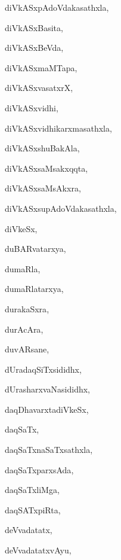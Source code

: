 \begin{multicols}{3}
{\noindent
{diVkASxpAdoVdakasathxla}, \pageref{diVkASxpAdoVdakasathxla}

\noindent
{diVkASxBasita}, \pageref{diVkASxBasita}

\noindent
{diVkASxBeVda}, \pageref{diVkASxBeVda}

\noindent
{diVkASxmaMTapa}, \pageref{diVkASxmaMTapa}

\noindent
{diVkASxvasatxrX}, \pageref{diVkASxvasatxrX}

\noindent
{diVkASxvidhi}, \pageref{diVkASxvidhi}

\noindent
{diVkASxvidhikarxmasathxla}, \pageref{diVkASxvidhikarxmasathxla}

\noindent
{diVkASxshuBakAla}, \pageref{diVkASxshuBakAla}

\noindent
{diVkASxsaMsakxqqta}, \pageref{diVkASxsaMsakxqqta}

\noindent
{diVkASxsaMsAkxra}, \pageref{diVkASxsaMsAkxra}

\noindent
{diVkASxsupAdoVdakasathxla}, \pageref{diVkASxsupAdoVdakasathxla}

\noindent
{diVkeSx}, \pageref{diVkeSx}

\noindent
{duBARvatarxya}, \pageref{duBARvatarxya}

\noindent
{dumaRla}, \pageref{dumaRla}

\noindent
{dumaRlatarxya}, \pageref{dumaRlatarxya}

\noindent
{durakaSxra}, \pageref{durakaSxra}

\noindent
{durAcAra}, \pageref{durAcAra}

\noindent
{duvARsane}, \pageref{duvARsane}

\noindent
{dUradaqSiTxsididhx}, \pageref{dUradaqSiTxsididhx}

\noindent
{dUrasharxvaNasididhx}, \pageref{dUrasharxvaNasididhx}

\noindent
{daqDhavarxtadiVkeSx}, \pageref{daqDhavarxtadiVkeSx}

\noindent
{daqSaTx}, \pageref{daqSaTx}

\noindent
{daqSaTxnaSaTxsathxla}, \pageref{daqSaTxnaSaTxsathxla}

\noindent
{daqSaTxparxsAda}, \pageref{daqSaTxparxsAda}

\noindent
{daqSaTxliMga}, \pageref{daqSaTxliMga}

\noindent
{daqSATxpiRta}, \pageref{daqSATxpiRta}

\noindent
{deVvadatatx}, \pageref{deVvadatatx}

\noindent
{deVvadatatxvAyu}, \pageref{deVvadatatxvAyu}

}
\end{multicols}

